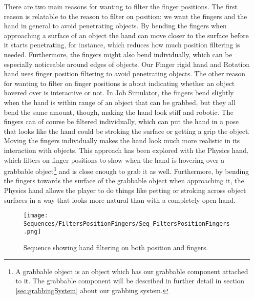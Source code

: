 There are two main reasons for wanting to filter the finger positions. The first reason is relatable to the reason to filter on position; we want the fingers and the hand in general to avoid penetrating objects. By bending the fingers when approaching a surface of an object the hand can move closer to the surface before it starts penetrating, for instance, which reduces how much position filtering is needed. Furthermore, the fingers might also bend individually, which can be especially noticeable around edges of objects. Our Finger rigid hand and Rotation hand uses finger position filtering to avoid penetrating objects. The other reason for wanting to filter on finger positions is about indicating whether an object hovered over is interactive or not. In Job Simulator, the fingers bend slightly when the hand is within range of an object that can be grabbed, but they all bend the same amount, though, making the hand look stiff and robotic. The fingers can of course be filtered individually, which can put the hand in a pose that looks like the hand could be stroking the surface or getting a grip the object. Moving the fingers individually makes the hand look much more realistic in its interaction with objects. This approach has been explored with the Physics hand, which filters on finger positions to show when the hand is hovering over a grabbable object\footnote{A grabbable object is an object which has our grabbable component attached to it. The grabbable component will be described in further detail in section \ref{sec:grabbingSystem} about our grabbing system.} and is close enough to grab it as well. Furthermore, by bending the fingers towards the surface of the grabbable object when approaching it, the Physics hand allows the player to do things like petting or stroking across object surfaces in a way that looks more natural than with a completely open hand.


\begin{figure}[H]
\centering
\texttt{[image: Sequences/FiltersPositionFingers/Seq\_FiltersPositionFingers.png]}
\caption{Sequence showing hand filtering on both position and fingers.}
\label{fig:filtersPositionFingers}
\end{figure}

